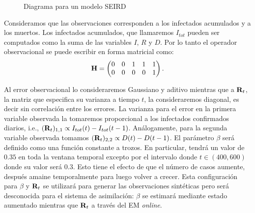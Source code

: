 \begin{figure}[h]
    \centering
    \caption{Diagrama para un modelo SEIRD} \label{dia:seird}
\end{figure}

Consideramos que las observaciones corresponden a los infectados acumulados y a los muertos. Los infectados acumulados, que llamaremos $I_{tot}$ pueden ser computados como la suma de las variables $I$, $R$ y $D$. Por lo tanto el operador observacional se puede escribir en forma matricial como:
\begin{align*}
    \mathbf{H} = 
    \begin{pmatrix}
        0 & 0 & 1 & 1 & 1 \\
        0 & 0 & 0 & 0 & 1 
    \end{pmatrix}.
\end{align*}

Al error observacional lo consideraremos Gaussiano y aditivo mientras que a $\mathbf{R}_t$, la matriz que especifica su varianza a tiempo $t$, la consideraremos diagonal, es decir sin correlación entre los errores. La varianza para el error en la primera variable observada la tomaremos proporcional a los infectados confirmados diarios,  i.e., $(\mathbf{R}_t)_{1,1} \propto I_{tot}(t) - I_{tot}(t-1)$. Análogamente, para la segunda variable observada tomamos $(\mathbf{R}_t)_{2,2} \propto D(t) - D(t-1)$. El parámetro $\beta$ será definido como una función constante a trozos. En particular, tendrá un valor de $0.35$ en toda la ventana temporal excepto por el intervalo donde $t \in (400, 600)$ donde su valor será $0.3$. Esto tiene el efecto de que el número de casos aumente, después amaine temporalmente para luego volver a crecer. Esta configuración para $\beta$ y $\mathbf{R}_t$ se utilizará para generar las observaciones sintéticas pero será desconocida para el sistema de asimilación: $\beta$ se estimará mediante estado aumentado mientras que $\mathbf{R}_t$ a través del EM \textit{online}.

